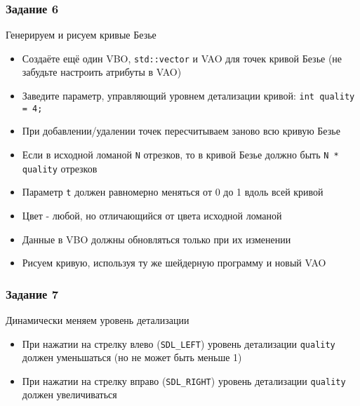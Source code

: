 \documentclass{beamer}
\begin{document}
\begin{frame}[fragile]
\frametitle{Задание 6}
Генерируем и рисуем кривые Безье
\begin{itemize}
\item Создаёте ещё один VBO, \verb|std::vector| и VAO для точек кривой Безье (не забудьте настроить атрибуты в VAO)
\pause
\item Заведите параметр, управляющий уровнем детализации кривой: \verb|int quality = 4;|
\pause
\item При добавлении/удалении точек пересчитываем заново всю кривую Безье
\item Если в исходной ломаной \verb|N| отрезков, то в кривой Безье должно быть \verb|N * quality| отрезков
\item Параметр \verb|t| должен равномерно меняться от 0 до 1 вдоль всей кривой
\item Цвет - любой, но отличающийся от цвета исходной ломаной
\item Данные в VBO должны обновляться только при их изменении
\pause
\item Рисуем кривую, используя ту же шейдерную программу и новый VAO
\end{itemize}
\end{frame}

\begin{frame}[fragile]
\frametitle{Задание 7}
Динамически меняем уровень детализации
\begin{itemize}
\item При нажатии на стрелку влево (\verb|SDL_LEFT|) уровень детализации \verb|quality| должен уменьшаться (но не может быть меньше 1)
\pause
\item При нажатии на стрелку вправо (\verb|SDL_RIGHT|) уровень детализации \verb|quality| должен увеличиваться
\end{itemize}
\end{frame}
\end{document}
